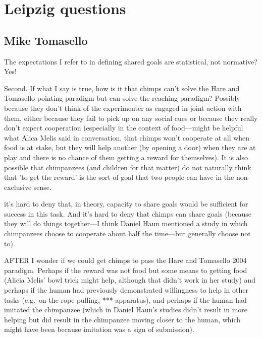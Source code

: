 \documentclass[14pt,a4paper]{extarticle}
\begin{document}
\setlength\footnotesep{1em}


\maketitle


\section{Leipzig questions}


\subsection{Mike Tomasello}
The expectations I refer to in defining shared goals are statistical, not normative?  Yes!

Second.  If what I say is true, how is it that chimps can't solve the Hare and Tomasello pointing paradigm but can solve the reaching paradigm?  Possibly because they don't think of the experimenter as engaged in joint action with them, either because they fail to pick up on any social cues or because they really don't expect cooperation (especially in the context of food---might be helpful what Alica Melis said in conversation, that chimps won't cooperate at all when food is at stake, but they will help another (by opening a door) when they are at play and there is no chance of them getting a reward for themselves).  It is also possible that chimpanzees (and children for that matter) do not naturally think that 'to get the reward' is the sort of goal that two people can have in the non-exclusive sense.

it's hard to deny that, in theory, capacity to share goals would be sufficient for success in this task.  And it's hard to deny that chimps can share goals (because they will do things together---I think Daniel Haun mentioned a study in which chimpanzees choose to cooperate about half the time---but generally choose not to).

AFTER I wonder if we could get chimps to pass the Hare and Tomasello 2004 paradigm.  Perhaps if the reward was not food but some means to getting food (Alicia Melis' bowl trick might help, although that didn't work in her study) and perhaps if the human had previously demonstrated willingness to help in other tasks (e.g.\ on the rope pulling, *** apparatus), and perhaps if the human had imitated the chimpanzee (which in Daniel Haun's studies didn't result in more helping but did result in the chimpanzee moving closer to the human, which might have been because imitation was a sign of submission).
\end{document}
